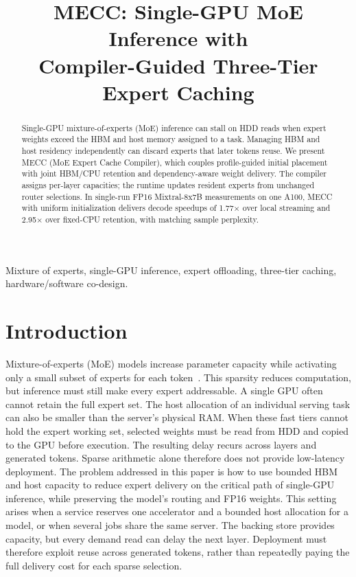 \documentclass[conference,9pt,letterpaper]{IEEEtran}
\title{MECC: Single-GPU MoE Inference with\protect\\Compiler-Guided Three-Tier Expert Caching}
\author{}
\begin{document}
\maketitle\raggedbottom
\begin{abstract}
Single-GPU mixture-of-experts (MoE) inference can stall on HDD reads when expert weights exceed the HBM and host memory assigned to a task. Managing HBM and host residency independently can discard experts that later tokens reuse. We present MECC (MoE Expert Cache Compiler), which couples profile-guided initial placement with joint HBM/CPU retention and dependency-aware weight delivery. The compiler assigns per-layer capacities; the runtime updates resident experts from unchanged router selections. In single-run FP16 Mixtral-8x7B measurements on one A100, MECC with uniform initialization delivers decode speedups of 1.77$\times$ over local streaming and 2.95$\times$ over fixed-CPU retention, with matching sample perplexity.
\end{abstract}

\begin{IEEEkeywords}
Mixture of experts, single-GPU inference, expert offloading, three-tier caching, hardware/software co-design.
\end{IEEEkeywords}

\section{Introduction}
Mixture-of-experts (MoE) models increase parameter capacity while activating only a small subset of experts for each token~\cite{shazeer,switch,mixtral,deepseekmoe}. This sparsity reduces computation, but inference must still make every expert addressable. A single GPU often cannot retain the full expert set. The host allocation of an individual serving task can also be smaller than the server's physical RAM. When these fast tiers cannot hold the expert working set, selected weights must be read from HDD and copied to the GPU before execution. The resulting delay recurs across layers and generated tokens. Sparse arithmetic alone therefore does not provide low-latency deployment. The problem addressed in this paper is how to use bounded HBM and host capacity to reduce expert delivery on the critical path of single-GPU inference, while preserving the model's routing and FP16 weights. This setting arises when a service reserves one accelerator and a bounded host allocation for a model, or when several jobs share the same server. The backing store provides capacity, but every demand read can delay the next layer. Deployment must therefore exploit reuse across generated tokens, rather than repeatedly paying the full delivery cost for each sparse selection.
\end{document}
